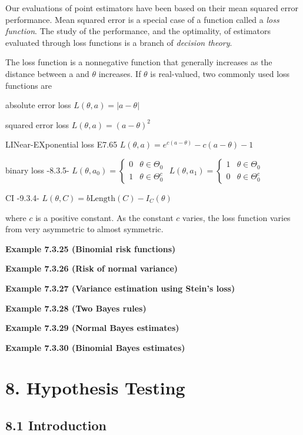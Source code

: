 \documentclass[6pt,twocolumn,Portrait]{article}
\begin{document}
Our evaluations of point estimators have been based on their mean
squared error performance. Mean squared error is a special case of a
function called a \emph{loss function}. The study of the performance,
and the optimality, of estimators evaluated through loss functions is a
branch of \emph{decision theory}.

The loss function is a nonnegative function that generally increases as
the distance between a and \(\theta\) increases. If \(\theta\) is
real-valued, two commonly used loss functions are

absolute error loss \(L(\theta,a)=|a-\theta|\)

squared error loss \(L(\theta,a)=(a-\theta)^2\)

LINear-EXponential loss E7.65
\(L(\theta,a)=e^{c(a-\theta)}-c(a-\theta)-1\)

binary loss -8.3.5-
\(L(\theta,a_0)=\begin{cases}0&\theta\in\Theta_0\\1&\theta\in\Theta^c_0\end{cases}\)
\(L(\theta,a_1)=\begin{cases}1&\theta\in\Theta_0\\0&\theta\in\Theta^c_0\end{cases}\)

CI -9.3.4- \(L(\theta,C)=b\text{Length}(C)-I_C(\theta)\)

where \(c\) is a positive constant. As the constant \(c\) varies, the
loss function varies from very asymmetric to almost symmetric.

\textbf{Example 7.3.25 (Binomial risk functions)}

\textbf{Example 7.3.26 (Risk of normal variance)}

\textbf{Example 7.3.27 (Variance estimation using Stein's loss)}

\textbf{Example 7.3.28 (Two Bayes rules)}

\textbf{Example 7.3.29 (Normal Bayes estimates)}

\textbf{Example 7.3.30 (Binomial Bayes estimates)}

\hypertarget{hypothesis-testing}{%
\section{8. Hypothesis Testing}\label{hypothesis-testing}}

\hypertarget{introduction-1}{%
\subsection{8.1 Introduction}\label{introduction-1}}
\end{document}
